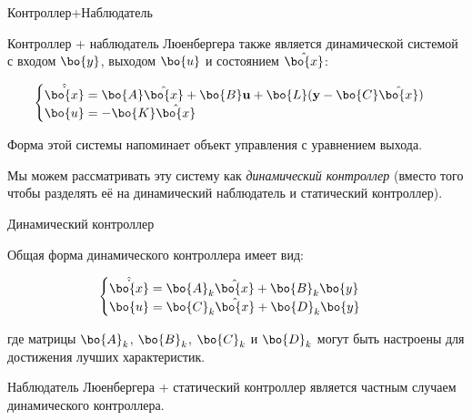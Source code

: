 \documentclass{beamer}
\begin{document}
\begin{frame}{Контроллер+Наблюдатель}
	\begin{flushleft}
		
		Контроллер + наблюдатель Люенбергера также является динамической системой с входом $\bo{y}$, выходом $\bo{u}$ и состоянием $\hat{\bo{x}}$:
		
		\begin{equation}
			\begin{cases}
				\hat{\dot {\bo{x}}} = \bo{A} \hat{\bo{x}} + \bo{B} \mathbf u + \bo{L}(\mathbf y - \bo{C} \hat{\bo{x}})
				\\
				\bo{u} = -\bo{K} \hat{\bo{x}}
			\end{cases}
		\end{equation}
		
		Форма этой системы напоминает объект управления с уравнением выхода.
		
		\bigskip
		
		Мы можем рассматривать эту систему как \emph{динамический контроллер} (вместо того чтобы разделять её на динамический наблюдатель и статический контроллер). 
		
	\end{flushleft}
\end{frame}

\begin{frame}{Динамический контроллер}
	\begin{flushleft}
		
		Общая форма динамического контроллера имеет вид:
		
		\begin{equation}
			\begin{cases}
				\hat{\dot {\bo{x}}} = \bo{A}_k \hat{\bo{x}} + \bo{B}_k \bo{y}
				\\
				\bo{u} = \bo{C}_k \hat{\bo{x}} + \bo{D}_k \bo{y}
			\end{cases}
		\end{equation}
		
		где матрицы $\bo{A}_k$, $\bo{B}_k$, $\bo{C}_k$ и $\bo{D}_k$ могут быть настроены для достижения лучших характеристик.
		
		\bigskip
		
		Наблюдатель Люенбергера + статический контроллер является частным случаем динамического контроллера.
		
	\end{flushleft}
\end{frame}
\end{document}
